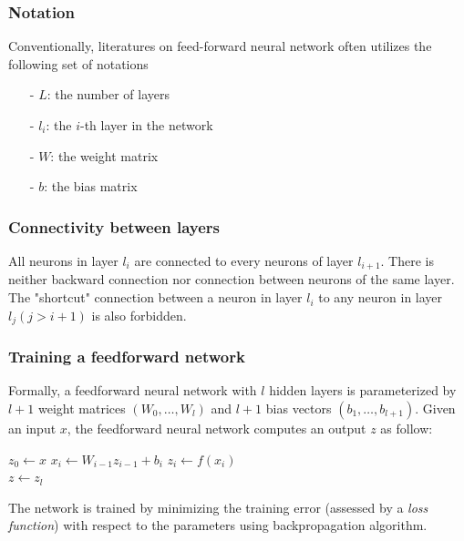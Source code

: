 	\subsubsection{Notation}
	Conventionally, literatures on feed-forward neural network often utilizes the following set of notations
	\begin{itemize}[nosep]
		\item[-] $L$: the number of layers
		\item[-] $l_i$: the $i$-th layer in the network
		\item[-] $W$: the weight matrix
		\item[-] $b$: the bias matrix
	\end{itemize}

	\subsubsection{Connectivity between layers}
	All neurons in layer $\mathit{l_i}$ are connected to every neurons of layer $\mathit{l_{i+1}}$. There is neither backward connection nor connection between neurons of the same layer. The "shortcut" connection between a neuron in layer $\mathit{l_i}$ to any neuron in layer $\mathit{l_j} \left(j > i + 1 \right)$ is also forbidden. 
	
	\subsubsection{Training a feedforward network}
	\nocite{Reed:1998:NSS:552600}
	Formally, a feedforward neural network with $l$ hidden layers is parameterized by $l + 1$ weight matrices $\left( W_0, \dots, W_l\right)$ and $l + 1$ bias vectors $\left( b_1, \dots, b_{l+1}\right)$. Given an input $x$, the feedforward neural network computes an output $z$ as follow:

	\begin{algorithm}
		\begin{algorithmic}
			\State $z_0 \gets x$
				\State $x_i \gets W_{i-1}z_{i-1} + b_i$
				\State $z_i \gets f\left(x_i\right)$
			\EndFor \\
			\Return $z \gets z_l$
		\end{algorithmic}
	\end{algorithm}

	The network is trained by minimizing the training error (assessed by a \textit{loss function}) with respect to the parameters using backpropagation algorithm.
	
